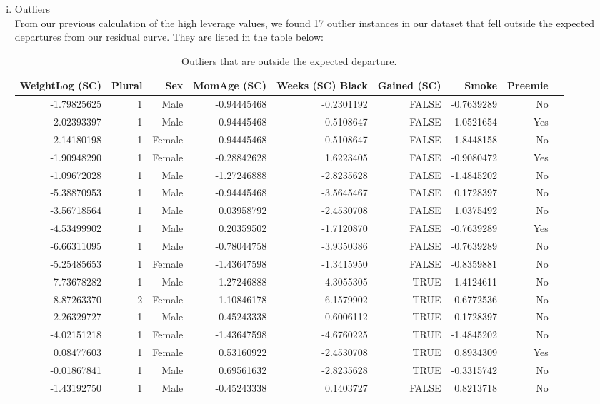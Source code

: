 \documentclass{article}\usepackage[]{graphicx}\usepackage[]{xcolor}
\begin{document}
\begin{enumerate}[a.]
\begin{enumerate}[i.]
\item Outliers\\

From our previous calculation of the high leverage values, we found 17 outlier instances in our dataset that fell outside the expected departures from our residual curve. They are listed in the table below:

\begin{table}[H]
\centering
\begin{tabular}{rrrrrrrrr}
  \hline
   WeightLog (SC) & Plural & Sex & MomAge (SC) & Weeks (SC) Black & Gained (SC) & Smoke & Preemie \\ 
  \hline
  -1.79825625 & 1 & Male & -0.94445468 & -0.2301192 & FALSE & -0.7639289 & No\\
  -2.02393397 & 1 &  Male & -0.94445468 & 0.5108647 & FALSE & -1.0521654 & Yes \\
  -2.14180198 & 1 & Female & -0.94445468 & 0.5108647 & FALSE & -1.8448158 & No \\
  -1.90948290 & 1 & Female & -0.28842628  & 1.6223405 & FALSE & -0.9080472 & Yes \\ 
  -1.09672028 & 1 &  Male & -1.27246888 & -2.8235628 &  FALSE & -1.4845202 & No \\
  -5.38870953 & 1 & Male & -0.94445468 & -3.5645467 & FALSE  & 0.1728397 & No \\
  -3.56718564 & 1 &  Male & 0.03958792 & -2.4530708 & FALSE & 1.0375492 & No \\
  -4.53499902 & 1 & Male & 0.20359502 & -1.7120870 & FALSE & -0.7639289 & Yes \\
  -6.66311095 & 1 & Male & -0.78044758 & -3.9350386 & FALSE & -0.7639289 & No \\
  -5.25485653 & 1 & Female & -1.43647598 & -1.3415950 & FALSE & -0.8359881 & No \\
  -7.73678282 & 1 & Male & -1.27246888 &-4.3055305 & TRUE & -1.4124611  & No \\
  -8.87263370 & 2 & Female & -1.10846178 & -6.1579902 & TRUE & 0.6772536 & No\\
  -2.26329727 & 1 & Male & -0.45243338 & -0.6006112 & TRUE & 0.1728397 & No \\
  -4.02151218 & 1 & Female & -1.43647598 & -4.6760225 & TRUE & -1.4845202 & No\\
   0.08477603 & 1 & Female & 0.53160922 & -2.4530708 & TRUE & 0.8934309 & Yes\\
  -0.01867841 & 1 & Male & 0.69561632 & -2.8235628 & TRUE & -0.3315742 & No \\
  -1.43192750 & 1 & Male & -0.45243338 & 0.1403727 & FALSE & 0.8213718 & No \\
   \hline
\end{tabular}
\caption{Outliers that are outside the expected departure.}
\label{outlier.table}
\end{table}



\end{enumerate}
\end{enumerate}
\end{document}
